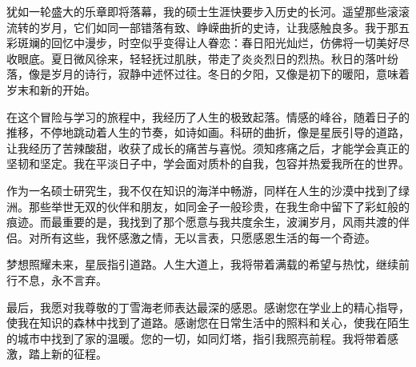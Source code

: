 \begin{acknowledgement}
  犹如一轮盛大的乐章即将落幕，我的硕士生涯快要步入历史的长河。遥望那些滚滚流转的岁月，它们如同一部错落有致、峥嵘曲折的史诗，让我感触良多。我于那五彩斑斓的回忆中漫步，时空似乎变得让人眷恋：春日阳光灿烂，仿佛将一切美好尽收眼底。夏日微风徐来，轻轻抚过肌肤，带走了炎炎烈日的烈热。秋日的落叶纷落，像是岁月的诗行，寂静中述怀过往。冬日的夕阳，又像是初下的暖阳，意味着岁末和新的开始。

  在这个冒险与学习的旅程中，我经历了人生的极致起落。情感的峰谷，随着日子的推移，不停地跳动着人生的节奏，如诗如画。科研的曲折，像是星辰引导的道路，让我经历了苦辣酸甜，收获了成长的痛苦与喜悦。须知疼痛之后，才能学会真正的坚韧和坚定。我在平淡日子中，学会面对质朴的自我，包容并热爱我所在的世界。

  作为一名硕士研究生，我不仅在知识的海洋中畅游，同样在人生的沙漠中找到了绿洲。那些举世无双的伙伴和朋友，如同金子一般珍贵，在我生命中留下了彩虹般的痕迹。而最重要的是，我找到了那个愿意与我共度余生，波澜岁月，风雨共渡的伴侣。对所有这些，我怀感激之情，无以言表，只愿感恩生活的每一个奇迹。

  梦想照耀未来，星辰指引道路。人生大道上，我将带着满载的希望与热忱，继续前行不息，永不言弃。

  最后，我愿对我尊敬的丁雪海老师表达最深的感恩。感谢您在学业上的精心指导，使我在知识的森林中找到了道路。感谢您在日常生活中的照料和关心，使我在陌生的城市中找到了家的温暖。您的一切，如同灯塔，指引我照亮前程。我将带着感激，踏上新的征程。
\end{acknowledgement}
